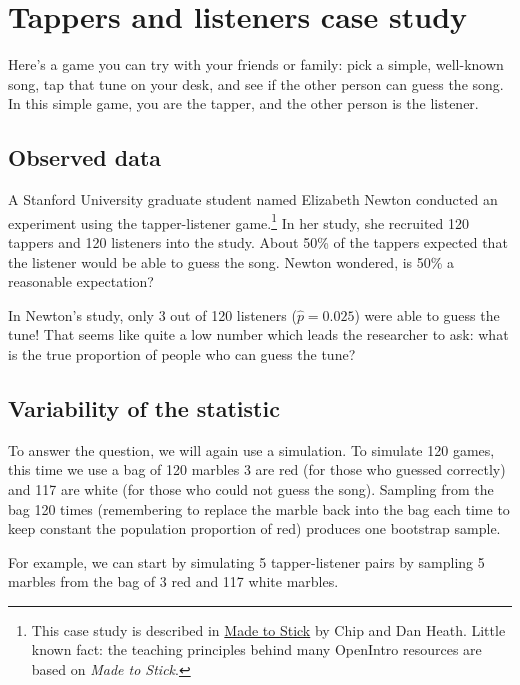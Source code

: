 \documentclass[
  10pt,
  openany]{book}
\begin{document}
\clearpage

\hypertarget{tapperscasestudy}{%
\section{Tappers and listeners case study}\label{tapperscasestudy}}

Here's a game you can try with your friends or family: pick a simple, well-known song, tap that tune on your desk, and see if the other person can guess the song.
In this simple game, you are the tapper, and the other person is the listener.

\hypertarget{observed-data-3}{%
\subsection{Observed data}\label{observed-data-3}}

A Stanford University graduate student named Elizabeth Newton conducted an experiment using the tapper-listener game.\footnote{This case study is described in \href{https://en.wikipedia.org/wiki/Made_to_Stick}{Made to Stick} by Chip and Dan Heath.
  Little known fact: the teaching principles behind many OpenIntro resources are based on \emph{Made to Stick}.}
In her study, she recruited 120 tappers and 120 listeners into the study.
About 50\% of the tappers expected that the listener would be able to guess the song.
Newton wondered, is 50\% a reasonable expectation?

In Newton's study, only 3 out of 120 listeners (\(\hat{p} = 0.025\)) were able to guess the tune!
That seems like quite a low number which leads the researcher to ask: what is the true proportion of people who can guess the tune?

\hypertarget{variability-of-the-statistic-3}{%
\subsection{Variability of the statistic}\label{variability-of-the-statistic-3}}

To answer the question, we will again use a simulation.
To simulate 120 games, this time we use a bag of 120 marbles 3 are red (for those who guessed correctly) and 117 are white (for those who could not guess the song).
Sampling from the bag 120 times (remembering to replace the marble back into the bag each time to keep constant the population proportion of red) produces one bootstrap sample.

For example, we can start by simulating 5 tapper-listener pairs by sampling 5 marbles from the bag of 3 red and 117 white marbles.
\end{document}
